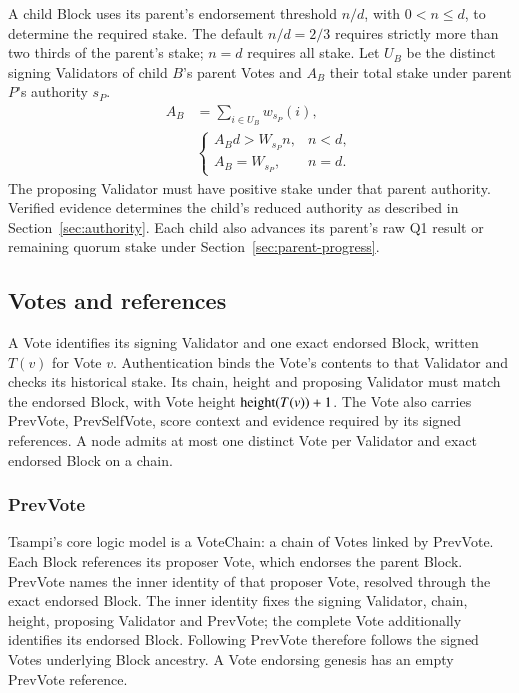 A child Block uses its parent's endorsement threshold $n/d$, with $0<n\leq d$, to determine the required stake.
The default $n/d=2/3$ requires strictly more than two thirds of the parent's stake; $n=d$ requires all stake.
Let $U_B$ be the distinct signing Validators of child $B$'s parent Votes and $A_B$ their total stake under parent $P$'s authority $s_P$.
\[
\begin{aligned}
A_B&=\sum_{i\in U_B}w_{s_P}(i),\\
&\begin{cases}
A_Bd>W_{s_P}n,&n<d,\\
A_B=W_{s_P},&n=d.
\end{cases}
\end{aligned}
\]
The proposing Validator must have positive stake under that parent authority.
Verified evidence determines the child's reduced authority as described in Section~\ref{sec:authority}.
Each child also advances its parent's raw Q1 result or remaining quorum stake under Section~\ref{sec:parent-progress}.

\subsection{Votes and references}

A Vote identifies its signing Validator and one exact endorsed Block, written $T(v)$ for Vote $v$.
Authentication binds the Vote's contents to that Validator and checks its historical stake.
Its chain, height and proposing Validator must match the endorsed Block, with Vote height $\operatorname{height}(T(v))+1$.
The Vote also carries PrevVote, PrevSelfVote, score context and evidence required by its signed references.
A node admits at most one distinct Vote per Validator and exact endorsed Block on a chain.

\subsubsection{PrevVote}

Tsampi's core logic model is a VoteChain: a chain of Votes linked by PrevVote.
Each Block references its proposer Vote, which endorses the parent Block.
PrevVote names the inner identity of that proposer Vote, resolved through the exact endorsed Block.
The inner identity fixes the signing Validator, chain, height, proposing Validator and PrevVote; the complete Vote additionally identifies its endorsed Block.
Following PrevVote therefore follows the signed Votes underlying Block ancestry.
A Vote endorsing genesis has an empty PrevVote reference.

